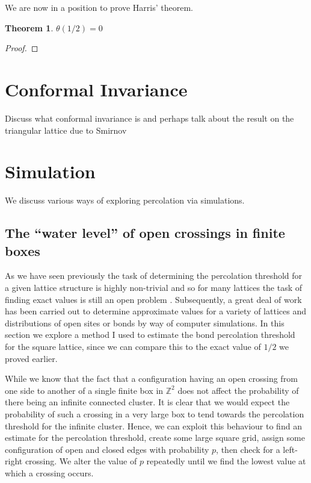 \documentclass[a4paper,11pt]{article}
\newtheorem{theorem}{Theorem}[section]
\theoremstyle{definition}
\newcommand{\ints}{\mathbb{Z}}
\begin{document}
We are now in a position to prove Harris' theorem.

\begin{theorem}
	$\theta(1/2) = 0$
\end{theorem}

\begin{proof}
	
\end{proof}



\section{Conformal Invariance}
Discuss what conformal invariance is and perhaps talk about the result on the triangular lattice due to Smirnov

\section{Simulation}
We discuss various ways of exploring percolation via simulations.
\subsection{The ``water level'' of open crossings in finite boxes}

As we have seen previously the task of determining the percolation threshold for a given lattice structure is highly non-trivial and so for many lattices the task of finding exact values is still an open problem \cite{StoverThreshold}. Subsequently, a great deal of work has been carried out to determine approximate values for a variety of lattices and distributions of open sites or bonds by way of computer simulations. In this section we explore a method I used to estimate the bond percolation threshold for the square lattice, since we can compare this to the exact value of $1/2$ we proved earlier. 

While we know that the fact that a configuration having an open crossing from one side to another of a single finite box in $\ints^2$ does not affect the probability of there being an infinite connected cluster. It is clear that we would expect the probability of such a crossing in a very large box to tend towards the percolation threshold for the infinite cluster. Hence, we can exploit this behaviour to find an estimate for the percolation threshold, create some large square grid, assign some configuration of open and closed edges with probability $p$, then check for a left-right crossing. We alter the value of $p$ repeatedly until we find the lowest value at which a crossing occurs.
\end{document}
